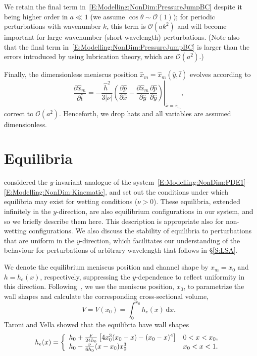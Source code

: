 \documentclass{jfm}
\newcommand{\ddp}[2]{\frac{\partial #1}{\partial #2}}
\newcommand{\aspect}{a} %
\newcommand{\h}{h}
\newcommand{\x}{x}
\begin{document}
We retain the final term in~\eqref{E:Modelling:NonDim:PressureJumpBC} despite it being higher order in $\aspect \ll 1$ (we assume $\cos \theta \sim \mathcal{O}(1)$); for periodic perturbations with wavenumber $k$, this term is $\mathcal{O}(\aspect k^2)$ and will become important for large wavenumber (short wavelength) perturbations. (Note also that the final term in~\eqref{E:Modelling:NonDim:PressureJumpBC} is larger than the errors introduced by using lubrication theory, which are $\mathcal{O}(\aspect^2)$.)

Finally, the dimensionless meniscus position $\hat{x}_m = \hat{x}_m(\hat{y}, \hat{t})$ evolves according to
\begin{equation}\label{E:Modelling:NonDim:Kinematic}
\ddp{ \hat{x} _m}{\hat{t}} = -\left.\frac{\hat{h}^2}{3|\nu|}\left(\ddp{\hat{p}}{\hat{x}} - \ddp{\hat{x}_m}{\hat{y}}\ddp{\hat{p}}{\hat{y}} \right)  \right|_{\hat{x} = \hat{x}_m},
\end{equation}
correct to $\mathcal{O}(\aspect^2)$. Henceforth, we drop hats and all variables are assumed dimensionless. 


\section{Equilibria}\label{S:Equilibria}
\citet{Taroni2012JFM} considered the $y$-invariant analogue of the system~\eqref{E:Modelling:NonDim:PDE1}--\eqref{E:Modelling:NonDim:Kinematic}, and set out the conditions under which equilibria may exist for wetting conditions ($\nu > 0$). These equilibria, extended infinitely in the $y$-direction, are also equilibrium configurations in our system, and so we briefly describe them here. This description is appropriate also for non-wetting configurations. We also discuss the stability of equilibria to perturbations that are uniform in  the $y$-direction, which facilitates our understanding of the behaviour for perturbations of arbitrary wavelength that follows in \S\ref{S:LSA}. 

We denote the equilibrium meniscus position and channel shape by $x_m = x_0$ and $h = h_e(x)$, respectively, suppressing the $y$-dependence to reflect uniformity in this direction. Following~\citet{Taroni2012JFM}, we use the meniscus position, $x_0$, to parametrize the wall shapes and calculate the corresponding cross-sectional volume,
\begin{equation}\label{E:Equilibria:Volume}
V  = V(x_0) = \int_{0}^{x_0} h_e(x)~\mathrm{d}x.
\end{equation}
Taroni and Vella showed that the equilibria have wall shapes
\begin{equation}\label{E:Equilibria:EqShape}
\h_e(\x) = \left\{\begin{array}{l l}
 \h_0+ \frac{\nu}{24 \h_0}\left[4 x_0^3( \x_0 - \x) - ( \x_0 - \x)^4\right] &  0 < \x <  \x_0, \\
 \h_0 -\frac{\nu }{6 h_0}(\x - \x_0) \x_0^3 & \x_0 < \x < 1.
\end{array}\right.
\end{equation}
\end{document}
